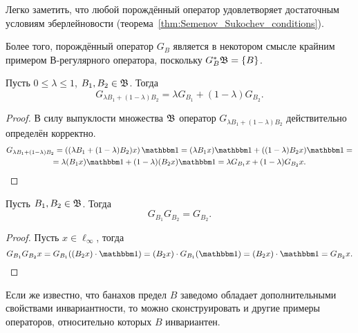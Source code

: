 \begin{remark}
	Легко заметить, что любой порождённый оператор удовлетворяет достаточным условиям эберлейновости
	(теорема~\ref{thm:Semenov_Sukochev_conditions}).
\end{remark}

\begin{remark}
	Более того, порождённый оператор $G_B$ является в некотором смысле крайним примером В-регулярного оператора,
	поскольку $G_B^* \mathfrak{B} = \{B\}$.
\end{remark}

\begin{lemma}
	Пусть $0 \leq \lambda \leq 1$, $B_1, B_2 \in \mathfrak{B}$.
	Тогда
	\begin{equation}
		G_{\lambda B_1+(1-\lambda) B_2} =\lambda G_{B_1} + (1-\lambda)G_{B_2}
		.
	\end{equation}
\end{lemma}


\begin{proof}
	В силу выпуклости множества $\mathfrak{B}$ оператор $G_{\lambda B_1+(1-\lambda) B_2}$
	действительно определён корректно.
	\begin{multline}
		G_{\lambda B_1+(1-\lambda) B_2} =
		\left((\lambda B_1+(1-\lambda) B_2) x\right)\one =
		(\lambda B_1 x) \one +((1-\lambda) B_2 x)\one =
		\\=
		\lambda (B_1 x) \one +(1-\lambda) (B_2 x)\one =
		\lambda G_{B_1} x +(1-\lambda) G_{B_2} x
		.
	\end{multline}
\end{proof}


\begin{lemma}
	Пусть $B_1, B_2 \in \mathfrak{B}$.
	Тогда
	\begin{equation}
		G_{B_1} G_{B_2} = G_{B_2}
		.
	\end{equation}
\end{lemma}
\begin{proof}
	Пусть $x\in\ell_\infty$, тогда
	\begin{equation}
		G_{B_1}G_{B_2}x =
		G_{B_1} ( (B_2 x) \cdot \one ) =
		(B_2 x) \cdot G_{B_1} ( \one ) =
		(B_2 x) \cdot  \one =
		G_{B_2}x
		.
	\end{equation}
\end{proof}


Если же известно, что банахов предел $B$ заведомо обладает дополнительными свойствами инвариантности,
то можно сконструировать и другие примеры операторов, относительно которых $B$ инвариантен.

